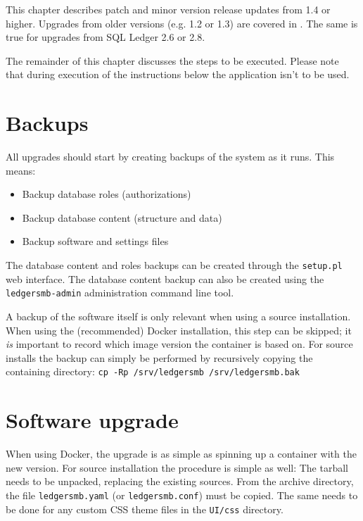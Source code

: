 This chapter describes patch and minor version release updates from 1.4 or higher.
Upgrades from older versions (e.g. 1.2 or 1.3) are covered in .
The same is true for upgrades from SQL Ledger 2.6 or 2.8.

The remainder of this chapter discusses the steps to be executed. Please note that during execution of the instructions below the application isn't to be used.

\section{Backups}
\label{sec-updates-backups}

All upgrades should start by creating backups  of the system as it runs.  This means:

\begin{itemize}
\item Backup database roles (authorizations)
\item Backup database content (structure and data)
\item Backup software and settings files
\end{itemize}

The database content and roles backups can be created through the \texttt{setup.pl} web interface.
The database content backup can also be created using the \texttt{ledgersmb-admin} administration
command line tool.

A backup of the software itself is only relevant when using a source installation. When using
the (recommended) Docker installation, this step can be skipped; it \textit{is} important to
record which image version the container is based on. For source installs the backup can simply
be performed by recursively copying the containing directory: 
\texttt{cp -Rp /srv/ledgersmb /srv/ledgersmb.bak}

\section{Software upgrade}
\label{sec-updates-software-upgrades}

When using Docker, the upgrade is as simple as spinning up a container with the new version.
For source installation the procedure is simple as well: The tarball needs to be unpacked,
replacing the existing sources.  From the archive directory, the file \texttt{ledgersmb.yaml}
(or \texttt{ledgersmb.conf}) must be copied.  The same needs to be done for any custom CSS
theme files in the \texttt{UI/css} directory.

